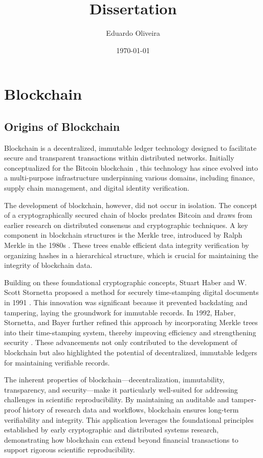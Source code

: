 \documentclass{article}
\title{Dissertation}
\author{Eduardo Oliveira}
\date{\today}
\begin{document}
\maketitle



\section{Blockchain}

\subsection{Origins of Blockchain}

Blockchain is a decentralized, immutable ledger technology designed to facilitate secure and transparent transactions within distributed networks. Initially conceptualized for the Bitcoin blockchain \cite{nakamoto2012bitcoin}, this technology has since evolved into a multi-purpose infrastructure underpinning various domains, including finance, supply chain management, and digital identity verification.

The development of blockchain, however, did not occur in isolation. The concept of a cryptographically secured chain of blocks predates Bitcoin and draws from earlier research on distributed consensus and cryptographic techniques. A key component in blockchain structures is the Merkle tree, introduced by Ralph Merkle in the 1980s \cite{goos_digital_1988}. These trees enable efficient data integrity verification by organizing hashes in a hierarchical structure, which is crucial for maintaining the integrity of blockchain data.

Building on these foundational cryptographic concepts, Stuart Haber and W. Scott Stornetta proposed a method for securely time-stamping digital documents in 1991 \cite{haber_how_1991}. This innovation was significant because it prevented backdating and tampering, laying the groundwork for immutable records. In 1992, Haber, Stornetta, and Bayer further refined this approach by incorporating Merkle trees into their time-stamping system, thereby improving efficiency and strengthening security \cite{bayer_improving_1993}. These advancements not only contributed to the development of blockchain but also highlighted the potential of decentralized, immutable ledgers for maintaining verifiable records.

The inherent properties of blockchain—decentralization, immutability, transparency, and security—make it particularly well-suited for addressing challenges in scientific reproducibility. By maintaining an auditable and tamper-proof history of research data and workflows, blockchain ensures long-term verifiability and integrity. This application leverages the foundational principles established by early cryptographic and distributed systems research, demonstrating how blockchain can extend beyond financial transactions to support rigorous scientific reproducibility.



\end{document}
